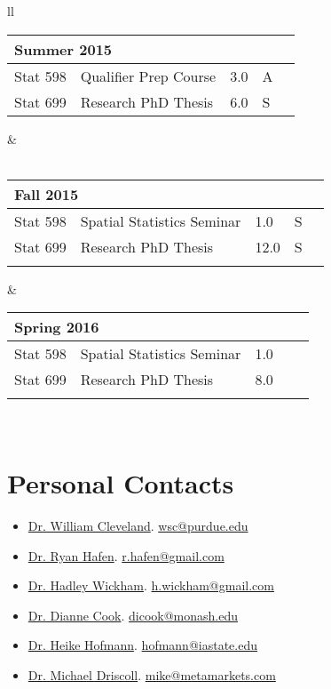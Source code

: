 \documentclass[oneside]{article}
\newcommand{\semtable}[1]{
  \begin{tabular}{p{1.5cm} p{3.5cm} p{.3cm} p{.3cm} p{0.75cm}}
    \multicolumn{5}{l}{#1}\\
    \hline
}
\newcommand{\semtableend}{
  \\
  \end{tabular}
}
\begin{document}
{\begin{tabular}{ll}
    \semtable{Summer 2015}
      Stat 598 & Qualifier Prep Course & 3.0 & A & \\
      Stat 699 & Research PhD Thesis & 6.0 & S &
    \semtableend
    &
    \\
	\\
    
    

    \semtable{Fall 2015}
      Stat 598 & Spatial Statistics Seminar & 1.0 & S & \\
      Stat 699 & Research PhD Thesis & 12.0 & S & \\
    \semtableend
    &
    \semtable{Spring 2016}
      Stat 598 & Spatial Statistics Seminar & 1.0 &  & \\
      Stat 699 & Research PhD Thesis & 8.0 &  & \\
    \semtableend
    \\



  \end{tabular}
} %


\section{Personal Contacts}

  \begin{itemize}

    \item \href{http://www.stat.purdue.edu/~wsc/}{Dr. William Cleveland}. \href{mailto:wsc@purdue.edu}{wsc@purdue.edu}

    \item \href{http://ryanhafen.com/}{Dr. Ryan Hafen}. \href{mailto:r.hafen@gmail.com}{r.hafen@gmail.com}

    \item \href{http://had.co.nz/}{Dr. Hadley Wickham}.  \href{mailto:h.wickham@gmail.com}{h.wickham@gmail.com}

    \item \href{http://dicook.github.io/}{Dr. Dianne Cook}.  \href{mailto:dicook@monash.edu}{dicook@monash.edu}

    \item \href{https://github.com/heike}{Dr. Heike Hofmann}.  \href{mailto:hofmann@iastate.edu}{hofmann@iastate.edu}

    \item \href{https://www.linkedin.com/profile/view?id=413949}{Dr. Michael Driscoll}. \href{mailto:mike@metamarkets.com}{mike@metamarkets.com}

  \end{itemize}
\end{document}
